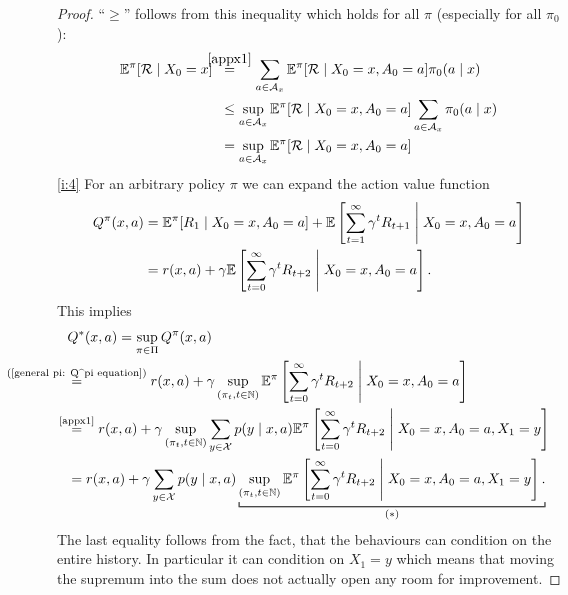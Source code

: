 \begin{proof}
	\noindent ``\(\geq\)'' follows from this inequality which holds for all \(\pi\) (especially for all \(\pi_0\)):
	\begin{align*}
		\E^\pi[\cR\mid X_0=x]\;\;
		&\lxeq{\ref{appx1}}\sum_{a\in\cA_x}\E^\pi[\cR \mid X_0=x,A_0=a]\pi_0(a\mid x)\\
		&\leq \sup_{a\in\cA_x}\E^\pi[\cR \mid X_0=x, A_0=a]\sum_{a\in\cA_x}\pi_0(a\mid x)\\
		&=\sup_{a\in\cA_x}\E^\pi[\cR \mid X_0=x, A_0=a]
	\end{align*}
	\ref{i:4} For an arbitrary policy \(\pi\) we can expand the action value function
	\begin{align}
		Q^\pi(x,a)&=\mathbb{E}^\pi[R_1\mid X_0=x, A_0=a]
		+\mathbb{E}\left[\sum_{t=1}^\infty \gamma^t R_{t+1}\;\middle|\; X_0=x,A_0=a\right]
		\nonumber\\
		&=r(x,a) + \gamma \mathbb{E}\left[\sum_{t=0}^\infty \gamma^t R_{t+2}\;\middle|\; X_0=x,A_0=a\right]. \label{general pi: Q^pi equation}
	\end{align}
	This implies
	\begin{align*}
		&Q^*(x,a)=\sup_{\pi\in\Pi} Q^\pi (x,a)
		\\
		&\lxeq{\text{(\ref{general pi: Q^pi equation})}} r(x,a)
		+ \gamma \sup_{(\pi_t,t\in\N)} \E^\pi\left[\sum_{t=0}^\infty \gamma^t R_{t+2}
		\;\middle|\; X_0=x,A_0=a \right]
		\\
		&\lxeq{\text{\ref{appx1}}}r(x,a)
		+\gamma \sup_{(\pi_t,t\in\N)} \sum_{y\in\cX} p(y\mid x, a)
		\E^\pi\left[\sum_{t=0}^\infty \gamma^t R_{t+2}\;\middle|\; X_0=x,A_0=a, X_1=y \right]
		\\
		&=r(x,a)
		+\gamma \sum_{y\in\cX} p(y\mid x, a) \underbracket[0.7pt]{
			\sup_{(\pi_t,t\in\N)}
			\E^\pi\left[\sum_{t=0}^\infty \gamma^t R_{t+2}\;\middle|\; X_0=x,A_0=a, X_1=y \right].
		}_{(*)}
	\end{align*}
	The last equality follows from the fact, that the behaviours can condition on the entire history. In particular it can condition on \(X_1=y\) which means that moving the supremum into the sum does not actually open any room for improvement. 


\end{proof}
